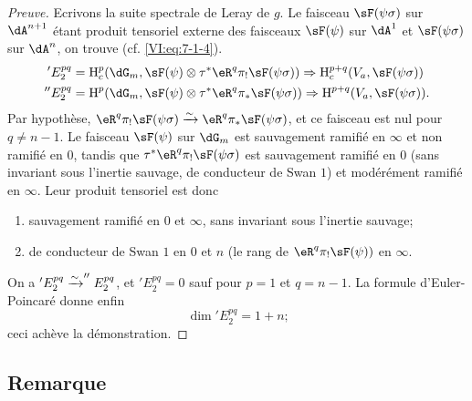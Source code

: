 \begin{proof}[Preuve]
Ecrivons la suite spectrale de Leray de $g$. Le faisceau $\sF(\psi\sigma)$ sur 
$\dA^{n+1}$ \'etant produit tensoriel externe des faisceaux $\sF(\psi)$ sur 
$\dA^1$ et $\sF(\psi\sigma)$ sur $\dA^n$, on trouve (cf. \eqref{VI:eq:7-1-4}). 
\begin{align*}
  'E_2^{p q} &= \h_c^p(\dG_m,\sF(\psi)\otimes \tau^\ast \eR^q \pi_! \sF(\psi\sigma)) \Rightarrow \h_c^{p+q}(V_a,\sF(\psi\sigma)) \\
  ''E_2^{p q} &= \h^p(\dG_m,\sF(\psi)\otimes \tau^\ast \eR^q \pi_\ast \sF(\psi\sigma)) \Rightarrow \h^{p+q}(V_a,\sF(\psi\sigma)) \text{.} 
\end{align*}
Par hypoth\`ese, 
$\eR^q \pi_! \sF(\psi\sigma) \iso \eR^q \pi_\ast \sF(\psi\sigma)$, et ce 
faisceau est nul pour $q\ne n-1$. Le faisceau $\sF(\psi)$ sur $\dG_m$ est 
sauvagement ramifi\'e en $\infty$ et non ramifi\'e en $0$, tandis que 
$\tau^\ast \eR^q \pi_! \sF(\psi\sigma)$ est sauvagement ramifi\'e en $0$ (sans 
invariant sous l'inertie sauvage, de conducteur de Swan $1$) et mod\'er\'ement 
ramifi\'e en $\infty$. Leur produit tensoriel est donc 
\begin{enumerate}[\indent a)]
  \item sauvagement ramifi\'e en $0$ et $\infty$, sans invariant sous l'inertie 
    sauvage; 
  \item de conducteur de Swan $1$ en $0$ et $n$ (le rang de 
    $\eR^q \pi_! \sF(\psi))$ en $\infty$. 
\end{enumerate}
On a $'E_2^{p q} \xrightarrow\sim ''E_2^{p q}$, et $'E_2^{p q}=0$ sauf pour $p=1$ et 
$q=n-1$. La formule d'Euler-Poincar\'e donne enfin 
\[
  \dim{'E_2^{p q}} = 1+n \text{;} 
\]
ceci ach\`eve la d\'emonstration. 
\end{proof}





\subsection{Remarque}\label{VI:7-15}

